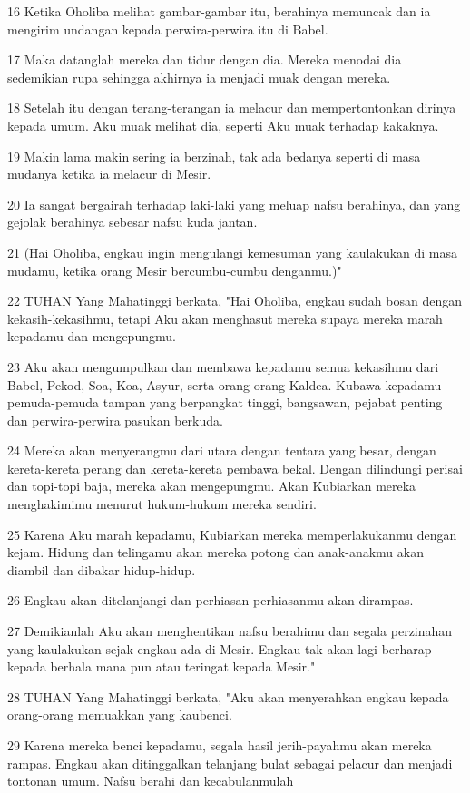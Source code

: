 \par 16 Ketika Oholiba melihat gambar-gambar itu, berahinya memuncak dan ia mengirim undangan kepada perwira-perwira itu di Babel.
\par 17 Maka datanglah mereka dan tidur dengan dia. Mereka menodai dia sedemikian rupa sehingga akhirnya ia menjadi muak dengan mereka.
\par 18 Setelah itu dengan terang-terangan ia melacur dan mempertontonkan dirinya kepada umum. Aku muak melihat dia, seperti Aku muak terhadap kakaknya.
\par 19 Makin lama makin sering ia berzinah, tak ada bedanya seperti di masa mudanya ketika ia melacur di Mesir.
\par 20 Ia sangat bergairah terhadap laki-laki yang meluap nafsu berahinya, dan yang gejolak berahinya sebesar nafsu kuda jantan.
\par 21 (Hai Oholiba, engkau ingin mengulangi kemesuman yang kaulakukan di masa mudamu, ketika orang Mesir bercumbu-cumbu denganmu.)"
\par 22 TUHAN Yang Mahatinggi berkata, "Hai Oholiba, engkau sudah bosan dengan kekasih-kekasihmu, tetapi Aku akan menghasut mereka supaya mereka marah kepadamu dan mengepungmu.
\par 23 Aku akan mengumpulkan dan membawa kepadamu semua kekasihmu dari Babel, Pekod, Soa, Koa, Asyur, serta orang-orang Kaldea. Kubawa kepadamu pemuda-pemuda tampan yang berpangkat tinggi, bangsawan, pejabat penting dan perwira-perwira pasukan berkuda.
\par 24 Mereka akan menyerangmu dari utara dengan tentara yang besar, dengan kereta-kereta perang dan kereta-kereta pembawa bekal. Dengan dilindungi perisai dan topi-topi baja, mereka akan mengepungmu. Akan Kubiarkan mereka menghakimimu menurut hukum-hukum mereka sendiri.
\par 25 Karena Aku marah kepadamu, Kubiarkan mereka memperlakukanmu dengan kejam. Hidung dan telingamu akan mereka potong dan anak-anakmu akan diambil dan dibakar hidup-hidup.
\par 26 Engkau akan ditelanjangi dan perhiasan-perhiasanmu akan dirampas.
\par 27 Demikianlah Aku akan menghentikan nafsu berahimu dan segala perzinahan yang kaulakukan sejak engkau ada di Mesir. Engkau tak akan lagi berharap kepada berhala mana pun atau teringat kepada Mesir."
\par 28 TUHAN Yang Mahatinggi berkata, "Aku akan menyerahkan engkau kepada orang-orang memuakkan yang kaubenci.
\par 29 Karena mereka benci kepadamu, segala hasil jerih-payahmu akan mereka rampas. Engkau akan ditinggalkan telanjang bulat sebagai pelacur dan menjadi tontonan umum. Nafsu berahi dan kecabulanmulah
